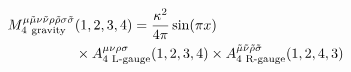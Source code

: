 \begin{equation}\begin{split}\label{eq23}
{M}_{\rm 4 \ gravity}^{\mu\tilde\mu\nu\tilde\nu\rho\tilde\rho\sigma\tilde\sigma}&(1,2,3,4) = \frac{\kappa^2}{4\pi}\sin(\pi x)\\&\times {A}^{\mu\nu\rho\sigma}_\text{4 L-gauge}(1,2,3,4)\times{A}^{\tilde\mu\tilde\nu\tilde\rho\tilde\sigma}_\text{4 R-gauge}(1,2,4,3)
\end{split}\end{equation}


